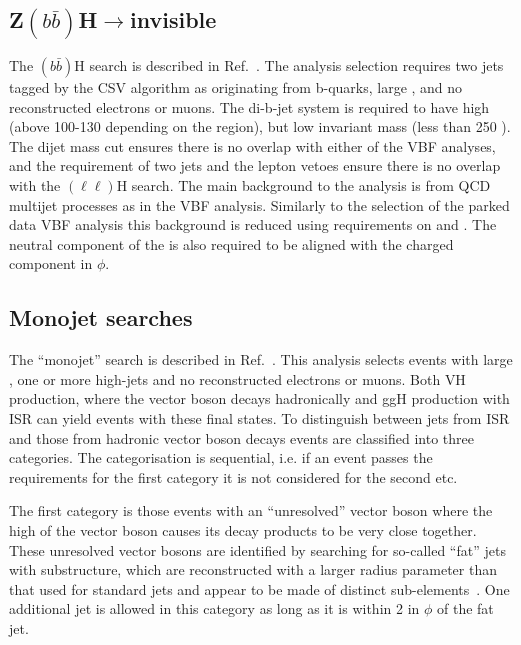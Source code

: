 \subsection{Z$(b\bar{b})$H$\rightarrow$invisible}
\label{sec:zbbh}
The \PZ$(b\bar{b})$H search is described in Ref.~\cite{CMS-PAS-HIG-13-028}. The analysis selection requires two jets tagged by the \ac{CSV} algorithm as originating from b-quarks, large \MET, and no reconstructed electrons or muons. The di-b-jet system is required to have high \pt (above 100-130 \GeV depending on the region), but low invariant mass (less than 250 \GeV). The dijet mass cut ensures there is no overlap with either of the \ac{VBF} analyses, and the requirement of two jets and the lepton vetoes ensure there is no overlap with the \PZ$(\ell\ell)$H search. The main background to the analysis is from \ac{QCD} multijet processes as in the \ac{VBF} analysis. Similarly to the selection of the parked data \ac{VBF} analysis this background is reduced using requirements on \jetmetdphi and \METsig. The neutral component of the \MET is also required to be aligned with the charged component in $\phi$. 


\subsection{Monojet searches}
\label{sec:monojet}
The ``monojet'' search is described in Ref.~\cite{CMS-PAS-EXO-12-055}. This analysis selects events with large \MET, one or more high-\pt jets and no reconstructed electrons or muons. Both \ac{VH} production, where the vector boson decays hadronically and \ac{ggH} production with \ac{ISR} can yield events with these final states. To distinguish between jets from \ac{ISR} and those from hadronic vector boson decays events are classified into three categories. The categorisation is sequential, i.e. if an event passes the requirements for the first category it is not considered for the second etc. 

The first category is those events with an ``unresolved'' vector boson where the high \pt of the vector boson causes its decay products to be very close together. These unresolved vector bosons are identified by searching for so-called ``fat'' jets with substructure, which are reconstructed with a larger radius parameter than that used for standard jets and appear to be made of distinct sub-elements~\cite{CMS-PAS-EXO-12-055}. One additional jet is allowed in this category as long as it is within 2 in $\phi$ of the fat jet.

